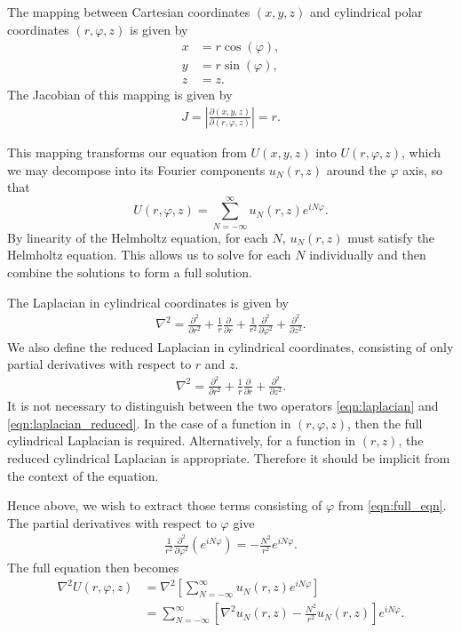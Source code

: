 The mapping between Cartesian coordinates $(x,y,z)$ and cylindrical polar coordinates $(r,\varphi,z)$ is given by
\begin{align}
	x &= r\cos(\varphi), \\
	y &= r\sin(\varphi), \\
	z &= z.
\end{align}
The Jacobian of this mapping is given by
\begin{align}
	J = \left\vert \frac{\partial(x,y,z)}{\partial(r,\varphi,z)} \right\vert = r. \label{eqn:cylindrical_mapping}
\end{align}

This mapping transforms our equation from $U(x,y,z)$ into $U(r,\varphi,z)$, 
which we may decompose into its Fourier components $u_N(r,z)$ around the $\varphi$ axis, so that
\begin{equation}
	U(r,\varphi,z) = \sum_{N=-\infty}^\infty u_N(r,z) e^{iN\varphi}. \label{eqn:full_eqn}
\end{equation}
By linearity of the Helmholtz equation, for each $N$, $u_N(r,z)$ must satisfy the Helmholtz equation.
This allows us to solve for each $N$ individually and then combine the solutions to form a full solution.

The Laplacian in cylindrical coordinates is given by
\begin{align}
	\nabla^2 = \frac{\partial^2 }{\partial r^2}
			 + \frac{1}{r} \frac{\partial }{\partial r}
			 + \frac{1}{r^2} \frac{\partial^2 }{\partial \varphi^2}
			 + \frac{\partial^2 }{\partial z^2}. \label{eqn:laplacian}
\end{align}
We also define the reduced Laplacian in cylindrical coordinates, consisting of only partial derivatives with respect to $r$ and $z$.
\begin{align}
	\nabla^2 = \frac{\partial^2 }{\partial r^2}
			 + \frac{1}{r} \frac{\partial }{\partial r}
			 + \frac{\partial^2 }{\partial z^2}. \label{eqn:laplacian_reduced}
\end{align}
It is not necessary to distinguish between the two operators \eqref{eqn:laplacian} and \eqref{eqn:laplacian_reduced}.
In the case of a function in $(r,\varphi,z)$, then the full cylindrical Laplacian is required.
Alternatively, for a function in $(r,z)$, the reduced cylindrical Laplacian is appropriate.
Therefore it should be implicit from the context of the equation.

Hence above, we wish to extract those terms consisting of $\varphi$ from \eqref{eqn:full_eqn}.
The partial derivatives with respect to $\varphi$ give
\begin{align}
	\frac{1}{r^2} \frac{\partial^2 }{\partial \varphi^2} \left( e^{i N \varphi}\right) = - \frac{N^2}{r^2} e^{i N \varphi}.
\end{align}
The full equation then becomes
\begin{align}
	\nabla^2 U(r,\varphi,z) 
		&= \nabla^2 \left[\sum_{N=-\infty}^\infty u_N(r,z) e^{i N \varphi}\right] \\
		&= \sum_{N=-\infty}^\infty \left[ 
										\nabla^2 u_N(r,z) - \frac{N^2}{r^2}u_N(r,z)
								   \right] e^{i N \varphi}.
\end{align}

